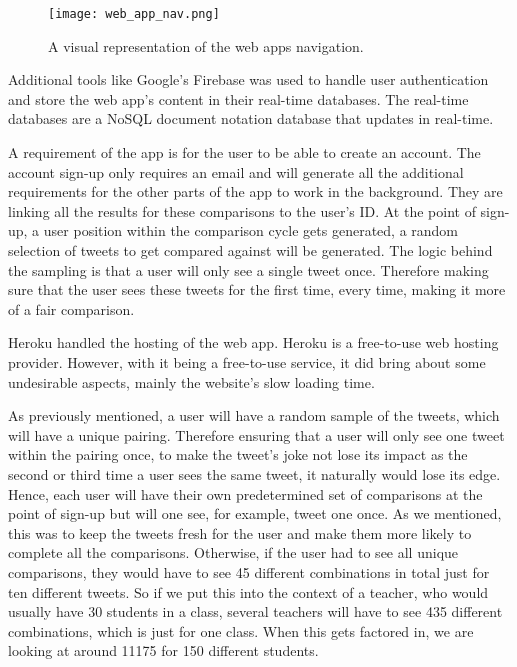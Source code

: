	\begin{figure}[t]
		\centering
		\texttt{[image: web\_app\_nav.png]}
		\caption{A visual representation of the web apps navigation.}
		\label{fig:web_app_nav}
		
	\end{figure}
	
	Additional tools like Google's Firebase was used to handle user authentication and store the web app's content in their real-time databases. The real-time databases are a NoSQL document notation database that updates in real-time. 
	
	A requirement of the app is for the user to be able to create an account. The account sign-up only requires an email and will generate all the additional requirements for the other parts of the app to work in the background. They are linking all the results for these comparisons to the user's ID. At the point of sign-up, a user position within the comparison cycle gets generated, a random selection of tweets to get compared against will be generated. The logic behind the sampling is that a user will only see a single tweet once. Therefore making sure that the user sees these tweets for the first time, every time, making it more of a fair comparison.
	
	Heroku handled the hosting of the web app. Heroku is a free-to-use web hosting provider. However, with it being a free-to-use service, it did bring about some undesirable aspects, mainly the website's slow loading time.
	
	As previously mentioned, a user will have a random sample of the tweets, which will have a unique pairing. Therefore ensuring that a user will only see one tweet within the pairing once, to make the tweet's joke not lose its impact as the second or third time a user sees the same tweet, it naturally would lose its edge. Hence, each user will have their own predetermined set of comparisons at the point of sign-up but will one see, for example, tweet one once. As we mentioned, this was to keep the tweets fresh for the user and make them more likely to complete all the comparisons. Otherwise, if the user had to see all unique comparisons, they would have to see 45 different combinations in total just for ten different tweets. So if we put this into the context of a teacher, who would usually have 30 students in a class, several teachers will have to see 435 different combinations, which is just for one class. When this gets factored in, we are looking at around 11175 for 150 different students.
	
